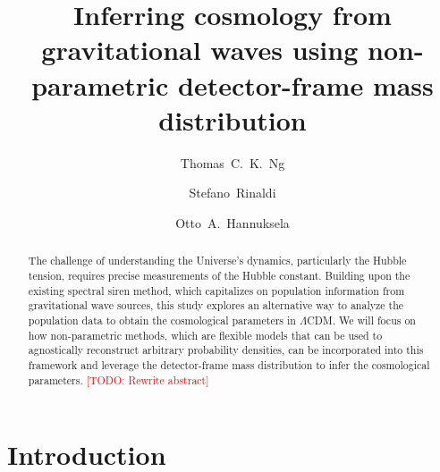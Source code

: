 \documentclass[twocolumn]{aastex631}
\newcommand{\todo}[1]{\textcolor{red}{[TODO: #1]}}
\begin{document}
\title{Inferring cosmology from gravitational waves using non-parametric detector-frame mass distribution}

\author{Thomas~C.~K.~Ng}

\author{Stefano~Rinaldi}

\author{Otto~A.~Hannuksela}


\begin{abstract}
    The challenge of understanding the Universe's dynamics, particularly the Hubble tension, requires precise measurements of the Hubble constant.
    Building upon the existing spectral siren method, which capitalizes on population information from gravitational wave sources, this study explores an alternative way to analyze the population data to obtain the cosmological parameters in $\Lambda$CDM.
    We will focus on how non-parametric methods, which are flexible models that can be used to agnostically reconstruct arbitrary probability densities, can be incorporated into this framework and leverage the detector-frame mass distribution to infer the cosmological parameters.
    \todo{Rewrite abstract}
\end{abstract}


\begin{acronym}
\end{acronym}

\section{Introduction}
\label{sec:introduction}
\end{document}

